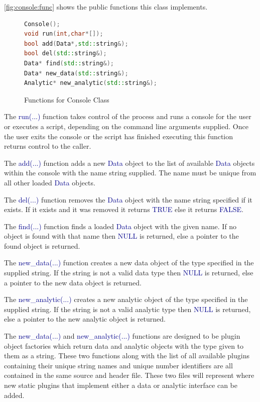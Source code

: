 \documentclass[10pt]{article}
\providecommand{\h}[1]{\textcolor{darkblue}{#1}}
\begin{document}
\autoref{fig:console:func} shows the public functions this class implements.

\begin{figure}[H]
\begin{mdframed}[style=functions]
\begin{lstlisting}[language=C++]
Console();
void run(int,char*[]);
bool add(Data*,std::string&);
bool del(std::string&);
Data* find(std::string&);
Data* new_data(std::string&);
Analytic* new_analytic(std::string&);
\end{lstlisting}
\end{mdframed}
\caption{Functions for Console Class}
\label{fig:console:func}
\end{figure}

The \h{run(...)} function takes control of the process and runs a console for 
the user or executes a script, depending on the command line arguments 
supplied. Once the user exits the console or the script has finished executing 
this function returns control to the caller.

The \h{add(...)} function adds a new \h{Data} object to the list of 
available \h{Data} objects within the console with the name string supplied. 
The name must be unique from all other loaded \h{Data} objects.

The \h{del(...)} function removes the \h{Data} object with the name 
string specified if it exists. If it exists and it was removed it returns 
\h{TRUE} else it returns \h{FALSE}.

The \h{find(...)} function finds a loaded \h{Data} object with the given name. 
If no object is found with that name then \h{NULL} is returned, else a 
pointer to the found object is returned.

The \h{new\_data(...)} function creates a new data object of the type 
specified in the supplied string. If the string is not a valid data type then 
\h{NULL} is returned, else a pointer to the new data object is returned.

The \h{new\_analytic(...)} creates a new analytic object of the type specified 
in the supplied string. If the string is not a valid analytic type then 
\h{NULL} is returned, else a pointer to the new analytic object is returned.

The \h{new\_data(...)} and \h{new\_analytic(...)} functions are designed to be 
plugin object factories which return data and analytic objects with the type 
given to them as a string. These two functions along with the list of all 
available plugins containing their unique string names and unique number 
identifiers are all contained in the same source and header file. These two 
files will represent where new static plugins that implement either a data or 
analytic interface can be added.
\end{document}
